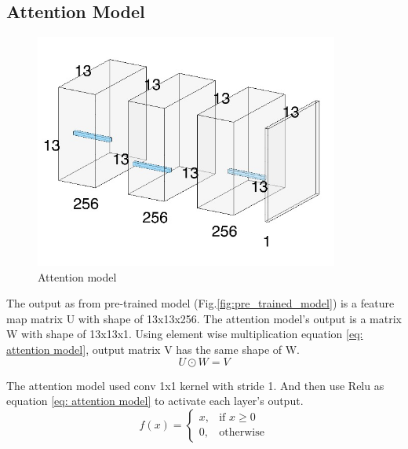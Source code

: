 \documentclass[senior]{IPSstyle}
\begin{document}
\subsection{Attention Model}\label{cha: attention model}
\begin{figure}[h]
    \centering
    \includegraphics[width=10cm]{MasterThesis-master/images/attension.jpg}
    \caption{Attention model}
    \label{fig:attention model}
\end{figure}

The output as from pre-trained model (Fig.\ref{fig:pre_trained_model}) is a feature map matrix U with shape of 13x13x256.
The attention model's output is a matrix W with shape of 13x13x1.
Using element wise multiplication equation \ref{eq: attention model}, output matrix V has the same shape of W.
\begin{equation}\label{eq: attention model}
U \odot W = V
\end{equation}

The attention model used conv 1x1 kernel with stride 1.
And then use Relu as equation \ref{eq: attention model} to activate each layer's output.
\begin{equation}\label{eq:relu}
    f(x)= 
\begin{cases}
    x,& \text{if } x\geq 0\\
    0,              & \text{otherwise}
\end{cases}
\end{equation}
\end{document}
